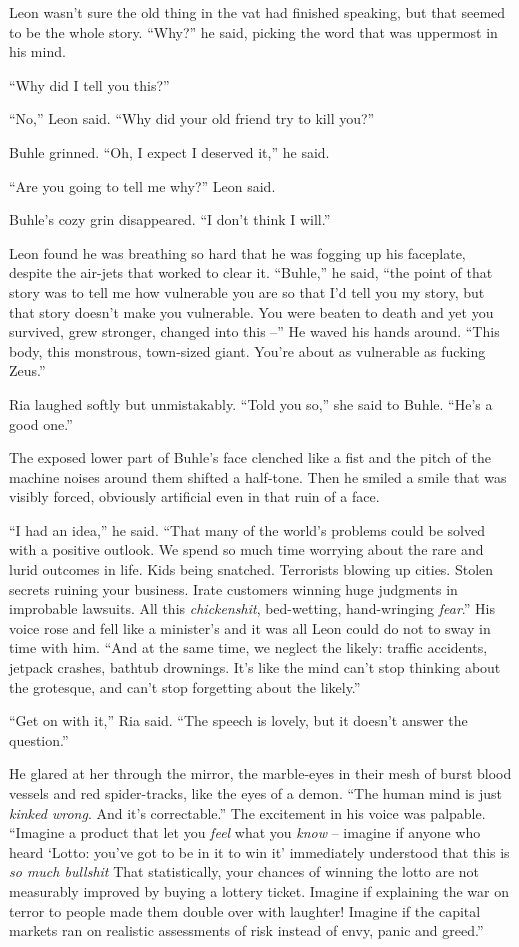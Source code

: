 Leon wasn't sure the old thing in the vat had finished speaking, but 
that seemed to be the whole story. “Why?” he said, picking the word 
that was uppermost in his mind.

“Why did I tell you this?”

“No,” Leon said. “Why did your old friend try to kill you?”

Buhle grinned. “Oh, I expect I deserved it,” he said.

“Are you going to tell me why?” Leon said.

Buhle's cozy grin disappeared. “I don't think I will.”

Leon found he was breathing so hard that he was fogging up his 
faceplate, despite the air-jets that worked to clear it. “Buhle,” 
he said, “the point of that story was to tell me how vulnerable you 
are so that I'd tell you my story, but that story doesn't make you 
vulnerable. You were beaten to death and yet you survived, grew 
stronger, changed into this --” He waved his hands around. “This 
body, this monstrous, town-sized giant. You're about as vulnerable as 
fucking Zeus.”

Ria laughed softly but unmistakably. “Told you so,” she said to 
Buhle. “He's a good one.”

The exposed lower part of Buhle's face clenched like a fist and the 
pitch of the machine noises around them shifted a half-tone. Then he 
smiled a smile that was visibly forced, obviously artificial even in 
that ruin of a face.

“I had an idea,” he said. “That many of the world's problems 
could be solved with a positive outlook. We spend so much time worrying 
about the rare and lurid outcomes in life. Kids being snatched. 
Terrorists blowing up cities. Stolen secrets ruining your business. 
Irate customers winning huge judgments in improbable lawsuits. All this 
\emph{chickenshit}, bed-wetting, hand-wringing \emph{fear}.” His 
voice rose and fell like a minister's and it was all Leon could do not 
to sway in time with him. “And at the same time, we neglect the 
likely: traffic accidents, jetpack crashes, bathtub drownings. It's 
like the mind can't stop thinking about the grotesque, and can't stop 
forgetting about the likely.”

“Get on with it,” Ria said. “The speech is lovely, but it doesn't 
answer the question.”

He glared at her through the mirror, the marble-eyes in their mesh of 
burst blood vessels and red spider-tracks, like the eyes of a demon. 
“The human mind is just \emph{kinked wrong}. And it's correctable.” 
The excitement in his voice was palpable. “Imagine a product that let 
you \emph{feel} what you \emph{know} -- imagine if anyone who heard 
`Lotto: you've got to be in it to win it' immediately understood that 
this is \emph{so much bullshit} That statistically, your chances of 
winning the lotto are not measurably improved by buying a lottery 
ticket. Imagine if explaining the war on terror to people made them 
double over with laughter! Imagine if the capital markets ran on 
realistic assessments of risk instead of envy, panic and greed.”


